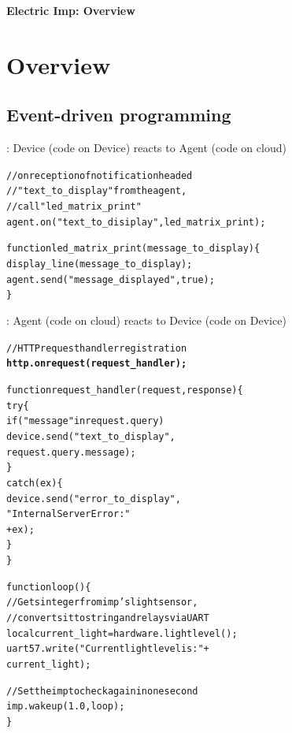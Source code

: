 \documentclass{myproc}
\begin{document}
\small


\begin{center}
{\large\bf Electric Imp: Overview}
\end{center}


\vspace*{1cm}

\tableofcontents

\section{Overview}
\subsection{Event-driven programming}
\bit
\w {}: Device (code on Device) reacts to Agent (code on cloud)
\begin{alltt}
  // on reception of notification headed 
  // "text_to_display" from the agent, 
  // call "led_matrix_print"
  \textcolor{red2}{agent.on("text_to_disiplay", led_matrix_print);}

  function led_matrix_print(message_to_display) \{
    display_line(message_to_display);
    \textcolor{red2}{agent.send("message_displayed", true);}
  \}
\end{alltt}
\w {}: Agent (code on cloud) reacts to Device (code on Device)
\begin{alltt}
  \textcolor{blue2}{// HTTP request handler registration}
  \textbf{\textcolor{blue2}{http.onrequest(request_handler);}}

  function request_handler(request, response) \{
    try \{
        if ("message" in request.query) 
          \textcolor{red2}{device.send("text_to_display", 
                      request.query.message);}
    \} 
    catch (ex) \{
        device.send("error_to_display", 
                    "Internal Server Error: " 
                    + ex);
    \}
  \}
\end{alltt}
\w {}
\begin{alltt}
function loop() \{
    // Gets integer from imp's light sensor, 
    // converts it to string and relays via UART
    local current_light = hardware.lightlevel();
    uart57.write("Current light level is: " + 
                 current_light);

    // Set the imp to check again in one second
    imp.wakeup(1.0, loop);
\}
\end{alltt}
\eit
\end{document}
